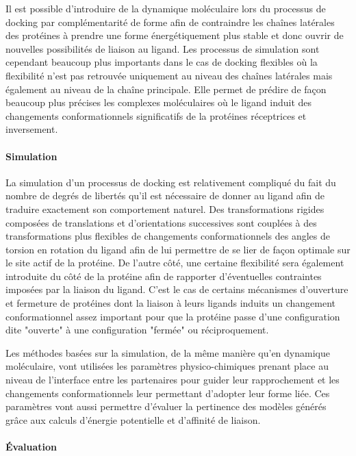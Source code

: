 Il est possible d'introduire de la dynamique moléculaire lors du processus de docking par complémentarité de forme afin de contraindre les chaînes latérales des protéines à prendre une forme énergétiquement plus stable et donc ouvrir de nouvelles possibilités de liaison au ligand.
Les processus de simulation sont cependant beaucoup plus importants dans le cas de docking flexibles où la flexibilité n'est pas retrouvée uniquement au niveau des chaînes latérales mais également au niveau de la chaîne principale. Elle permet de prédire de façon beaucoup plus précises les complexes moléculaires où le ligand induit des changements conformationnels significatifs de la protéines réceptrices et inversement.

\paragraph{Simulation}

La simulation d'un processus de docking est relativement compliqué du fait du nombre de degrés de libertés qu'il est nécessaire de donner au ligand afin de traduire exactement son comportement naturel. Des transformations rigides composées de translations et d'orientations successives sont couplées à des transformations plus flexibles de changements conformationnels des angles de torsion en rotation du ligand afin de lui permettre de se lier de façon optimale sur le site actif de la protéine. De l'autre côté, une certaine flexibilité sera également introduite du côté de la protéine afin de rapporter d'éventuelles contraintes imposées par la liaison du ligand. C'est le cas de certains mécanismes d'ouverture et fermeture de protéines dont la liaison à leurs ligands induits un changement conformationnel assez important pour que la protéine passe d'une configuration dite "ouverte" à une configuration "fermée" ou réciproquement.

Les méthodes basées sur la simulation, de la même manière qu'en dynamique moléculaire, vont utilisées les paramètres physico-chimiques prenant place au niveau de l'interface entre les partenaires pour guider leur rapprochement et les changements conformationnels leur permettant d'adopter leur forme liée. Ces paramètres vont aussi permettre d'évaluer la pertinence des modèles générés grâce aux calculs d'énergie potentielle et d'affinité de liaison. 

\paragraph{Évaluation}

